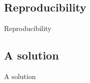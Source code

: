 \documentclass{beamer}
\begin{document}
\frame{\titlepage}

\subsection[IntroRepro]{Reproducibility}
\begin{frame}
\huge{Reproducibility}
\end{frame}


\subsection[Solution]{A solution}
\begin{frame}
\huge{A solution}
\end{frame}


%

%

\end{document}
